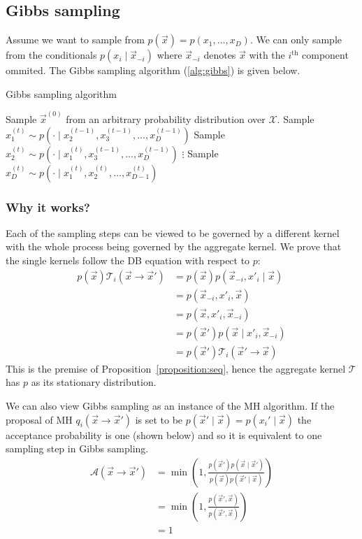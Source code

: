 \subsection{Gibbs sampling}
Assume we want to sample from $p(\vec x) = p(x_1, \dotsc, x_D)$. We can only sample from the conditionals $p(x_i \mid \vec x_{-i})$ where $\vec x_{-i}$ denotes $\vec x$ with the $i^{\text{th}}$ component ommited. The Gibbs sampling algorithm (\ref{alg:gibbs}) is given below.
\begin{algorithm}
\caption{Gibbs sampling algorithm}\label{alg:gibbs}
    \begin{algorithmic}[1]
        \State Sample $\vec x^{(0)}$ from an arbitrary probability distribution over $\mathcal X$.
            \State Sample $x_1^{(t)} \sim p\left(\cdot \mid x_2^{(t - 1)}, x_3^{(t - 1)}, \dotsc, x_D^{(t - 1)}\right)$
            \State Sample $x_2^{(t)} \sim p\left(\cdot \mid x_1^{(t)}, x_3^{(t - 1)}, \dotsc, x_D^{(t - 1)}\right)$
            \State $\vdots$
            \State Sample $x_D^{(t)} \sim p\left(\cdot \mid x_1^{(t)}, x_2^{(t)}, \dotsc, x_{D - 1}^{(t)}\right)$
        \EndFor
    \end{algorithmic}
\end{algorithm}

\subsubsection{Why it works?}
Each of the sampling steps can be viewed to be governed by a different kernel with the whole process being governed by the aggregate kernel. We prove that the single kernels follow the DB equation with respect to $p$:
\begin{align}
    p(\vec x) \mathcal T_i(\vec x \to \vec x')  &= p(\vec x) p(\vec x_{-i}, x'_i \mid \vec x) \\
                                                &= p(\vec x_{-i}, x'_i, \vec x) \\
                                                &= p(\vec x, x'_i, \vec x_{-i}) \\
                                                &= p(\vec x') p(\vec x \mid x'_i, \vec x_{-i}) \\
                                                &= p(\vec x') \mathcal T_i (\vec x' \to \vec x)
\end{align}
This is the premise of Proposition~\ref{proposition:seq}, hence the aggregate kernel $\mathcal T$ has $p$ as its stationary distribution.

We can also view Gibbs sampling as an instance of the MH algorithm. If the proposal of MH $q_i(\vec x \to \vec x')$ is set to be $p(\vec x' \mid \vec x) = p(x_i' \mid \vec x)$ the acceptance probability is one (shown below) and so it is equivalent to one sampling step in Gibbs sampling.
\begin{align}
    \mathcal A(\vec x \to \vec x')  &= \min\left(1, \frac{p(\vec x')p(\vec x \mid \vec x')}{p(\vec x)p(\vec x' \mid \vec x)}\right) \\
                                    &= \min\left(1, \frac{p(\vec x', \vec x)}{p(\vec x', \vec x)}\right) \\
                                    &= 1
\end{align}